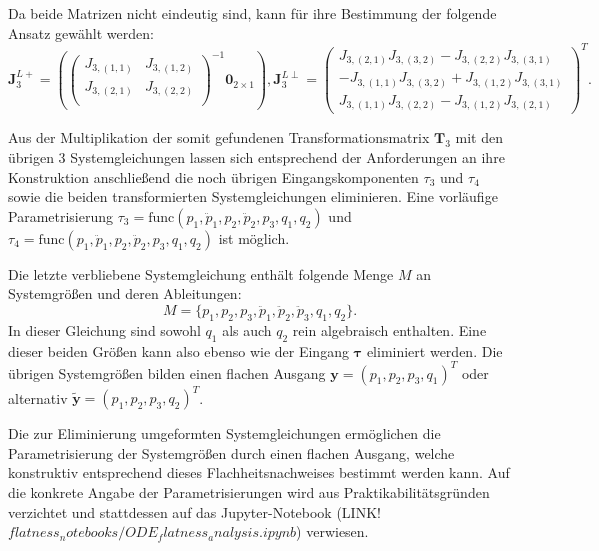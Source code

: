 Da beide Matrizen nicht eindeutig sind, kann für ihre Bestimmung der folgende Ansatz gewählt werden: 
\begin{equation}
	\mathbf{J}_3^{L+} =
	\left(
	\left(\begin{matrix}
		J_{3, (1,1)} & J_{3, (1,2)}\\
		J_{3, (2,1)} & J_{3, (2,2)}\\
	\end{matrix}\right)^{-1}	
	\mathbf{0}_{2 \times 1}
	\right), 		
	\mathbf{J}_3^{L\perp} =
	\left(\begin{matrix}
		J_{3, (2,1)} J_{3, (3,2)} - J_{3, (2,2)} J_{3, (3,1)} \\
		-J_{3, (1,1)} J_{3, (3,2)} + J_{3, (1,2)} J_{3, (3,1)} \\
		J_{3, (1,1)} J_{3, (2,2)} - J_{3, (1,2)} J_{3, (2,1)}
	\end{matrix}\right)^T.
\end{equation}

Aus der Multiplikation der somit gefundenen Transformationsmatrix $\mathbf{T}_3$ mit den übrigen 3 Systemgleichungen lassen sich entsprechend der Anforderungen an ihre Konstruktion anschließend die noch übrigen Eingangskomponenten $\tau_{3}$ und $\tau_{4}$ sowie die beiden transformierten Systemgleichungen eliminieren. Eine vorläufige Parametrisierung ${\tau_3 = \mathrm{func}(p_1, \ddot{p}_1, p_2, \ddot{p}_2, p_3, q_1, q_2)}$ und ${\tau_4 = \mathrm{func}(p_1, \ddot{p}_1, p_2, \ddot{p}_2, p_3, q_1, q_2)}$ ist möglich.

Die letzte verbliebene Systemgleichung enthält folgende Menge $M$ an Systemgrößen und deren Ableitungen:
\begin{equation}
	M = \{p_1, p_2, p_3, \ddot{p}_1, \ddot{p}_2, \ddot{p}_3, q_1, q_2 \}.
\end{equation}
In dieser Gleichung sind sowohl $q_1$ als auch $q_2$ rein algebraisch enthalten. Eine dieser beiden Größen kann also ebenso wie der Eingang $\boldsymbol{\tau}$ eliminiert werden. Die übrigen Systemgrößen bilden einen flachen Ausgang $\mathbf{y} = (p_1, p_2, p_3, q_1)^T$ oder alternativ ${\tilde{\mathbf{y}} = (p_1, p_2, p_3, q_2)^T}$.

Die zur Eliminierung umgeformten Systemgleichungen ermöglichen die Parametrisierung der Systemgrößen durch einen flachen Ausgang, welche konstruktiv entsprechend dieses Flachheitsnachweises bestimmt werden kann. Auf die konkrete Angabe der Parametrisierungen wird aus Praktikabilitätsgründen verzichtet und stattdessen auf das Jupyter-Notebook (LINK! $flatness_notebooks/ODE_flatness_analysis.ipynb$) verwiesen.

